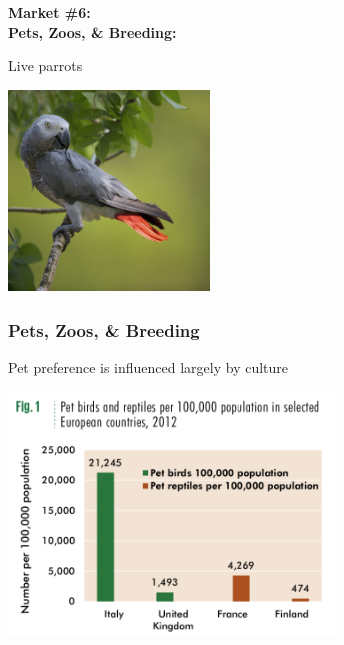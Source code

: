 \documentclass[10pt]{beamer}
\begin{document}
\begin{frame}
	\begin{center}
		\Large{\textbf{\textcolor{myblue}{Market \#6:\\ Pets, Zoos, \& Breeding:}}}\normalsize{}\\ 
		
		\vspace{0.25cm}
		
		Live parrots\\
		
		\vspace{0.5cm}
		
		\includegraphics[width=0.4\textwidth]{figures/parrot.jpg}
	\end{center}
\end{frame}


\begin{frame}[t]
\frametitle{Pets, Zoos, \& Breeding}
\vspace{0.5cm}

	Pet preference is influenced largely by culture\\
	
	\vspace{0.25cm}
	
	\begin{center}
		\includegraphics[width=0.65\textwidth]{figures/pet_trends.png}
	\end{center}
\end{frame}	
\end{document}
